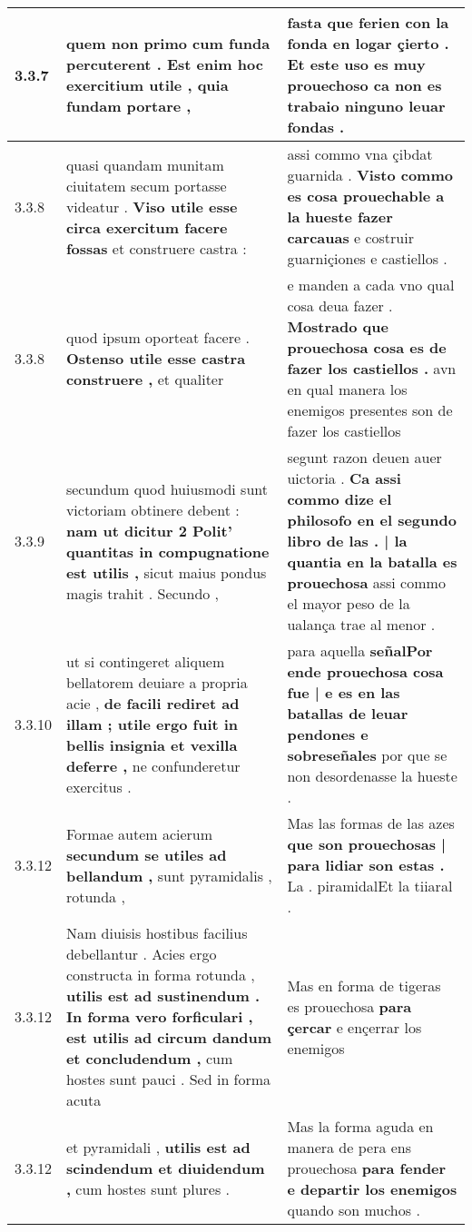 \begin{tabular}{|p{1cm}|p{6.5cm}|p{6.5cm}|}
3.3.7 & quem non primo cum funda percuterent . \textbf{ Est enim hoc exercitium utile , } quia fundam portare , & fasta que ferien con la fonda en logar çierto . \textbf{ Et este uso es muy prouechoso } ca non es trabaio ninguno leuar fondas . \\\hline
3.3.8 & quasi quandam munitam ciuitatem secum portasse videatur . \textbf{ Viso utile esse circa exercitum facere fossas } et construere castra : & assi commo vna çibdat guarnida . \textbf{ Visto commo es cosa prouechable a la hueste fazer carcauas } e costruir guarniçiones e castiellos . \\\hline
3.3.8 & quod ipsum oporteat facere . \textbf{ Ostenso utile esse castra construere , } et qualiter & e manden a cada vno qual cosa deua fazer . \textbf{ Mostrado que prouechosa cosa es de fazer los castiellos . } avn en qual manera los enemigos presentes son de fazer los castiellos \\\hline
3.3.9 & secundum quod huiusmodi sunt victoriam obtinere debent : \textbf{ nam ut dicitur 2 Polit’ quantitas in compugnatione est utilis , } sicut maius pondus magis trahit . Secundo , & segunt razon deuen auer uictoria . \textbf{ Ca assi commo dize el philosofo en el segundo libro de las . | la quantia en la batalla es prouechosa } assi commo el mayor peso de la ualança trae al menor . \\\hline
3.3.10 & ut si contingeret aliquem bellatorem deuiare a propria acie , \textbf{ de facili rediret ad illam ; utile ergo fuit in bellis insignia et vexilla deferre , } ne confunderetur exercitus . & para aquella \textbf{ señalPor ende prouechosa cosa fue | e es en las batallas de leuar pendones e sobreseñales } por que se non desordenasse la hueste . \\\hline
3.3.12 & Formae autem acierum \textbf{ secundum se utiles ad bellandum , } sunt pyramidalis , rotunda , & Mas las formas de las azes \textbf{ que son prouechosas | para lidiar son estas . } La . piramidalEt la tiiaral . \\\hline
3.3.12 & Nam diuisis hostibus facilius debellantur . Acies ergo constructa in forma rotunda , \textbf{ utilis est ad sustinendum . In forma vero forficulari , est utilis ad circum dandum et concludendum , } cum hostes sunt pauci . Sed in forma acuta & Mas en forma de tigeras es prouechosa \textbf{ para çercar } e ençerrar los enemigos \\\hline
3.3.12 & et pyramidali , \textbf{ utilis est ad scindendum et diuidendum , } cum hostes sunt plures . & Mas la forma aguda en manera de pera ens prouechosa \textbf{ para fender e departir los enemigos } quando son muchos . \\\hline

\end{tabular}
